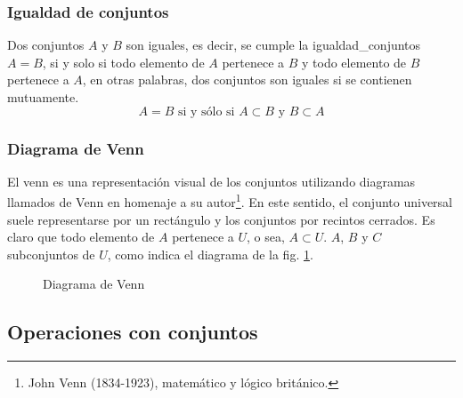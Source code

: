 \subsubsection{Igualdad de conjuntos}
\vspace{1em}
\begin{fmd-definition} \label{def:igualdad_conjuntos}
	Dos conjuntos $A$ y $B$ son iguales, es decir, se cumple la \gls{igualdad_conjuntos} $A = B$, si y solo si todo elemento de $A$ pertenece a $B$ y todo elemento de $B$ pertenece a $A$, en otras palabras, dos conjuntos son iguales si se contienen mutuamente.
	\[A = B \mbox{ si y sólo si } A \subset B \mbox{ y } B \subset A \]
\end{fmd-definition}

\subsubsection{Diagrama de Venn}

El \gls{venn} es una representación visual de los conjuntos utilizando diagramas llamados de Venn en homenaje a su autor\footnote{John Venn (1834-1923), matemático y lógico británico.}. En este sentido, el conjunto universal suele representarse por un rectángulo y los conjuntos por recintos cerrados. Es claro que todo elemento de $A$ pertenece a $U$, o sea, $A \subset U$. $A$, $B$ y $C$ subconjuntos de $U$, como indica el diagrama de la fig. \ref{fig:Venn}.

\begin{figure}[H]
	\centering
	\caption{Diagrama de Venn}
	\label{fig:Venn}
\end{figure}

\subsection{Operaciones con conjuntos}

